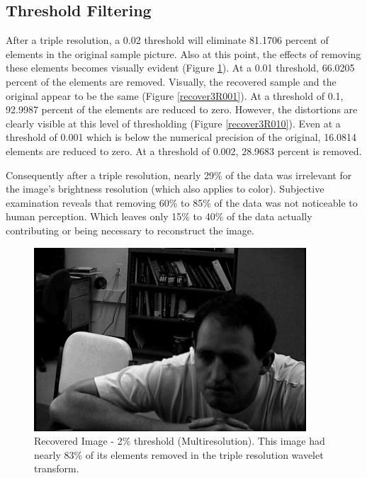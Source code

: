\subsection {Threshold Filtering}
After a triple resolution, a 0.02 threshold will eliminate 81.1706 percent of elements in the original sample picture.  Also at this point, the effects of removing these elements becomes visually evident (Figure \ref{recover3R002}).  At a 0.01 threshold,  66.0205 percent of the elements are removed.  Visually, the recovered sample and the original appear to be the same (Figure \ref{recover3R001}).  At a threshold of 0.1, 92.9987 percent of the elements are reduced to zero.  However, the distortions are clearly visible at this level of thresholding (Figure \ref{recover3R010}).  Even at a threshold of 0.001 which is below the numerical precision of the original, 16.0814 elements are reduced to zero.  At a threshold of 0.002, 28.9683 percent is removed.  

Consequently after a triple resolution, nearly 29\% of the data was irrelevant for the image's brightness resolution (which also applies to color).  Subjective examination reveals that removing 60\% to 85\% of the data was not noticeable to human perception.  Which leaves only 15\% to 40\% of the data actually contributing or being necessary to reconstruct the image.   

\begin{figure}[htb]
\begin{center}
\includegraphics [width=4in]{recover3R002T.jpg}
\end{center}
\caption{Recovered Image - 2\% threshold (Multiresolution). This image had nearly 83\% of its elements removed in the triple resolution wavelet transform.  }
\label{recover3R002}
\end{figure}


